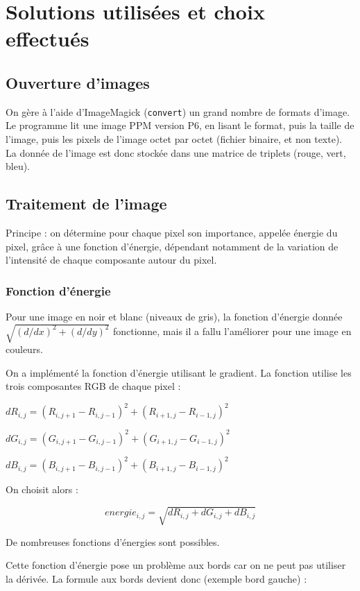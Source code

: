 \documentclass[a4paper]{article}
\begin{document}
\section{Solutions utilisées et choix effectués}

\subsection{Ouverture d'images}

On gère à l'aide d'ImageMagick ({\tt convert}) un grand nombre de formats d'image. Le programme lit une image PPM version P6, en lisant le format, puis la taille de l'image, puis les pixels de l'image octet par octet (fichier binaire, et non texte). La donnée de l'image est donc stockée dans une matrice de triplets (rouge, vert, bleu).


\subsection{Traitement de l'image}

Principe : on détermine pour chaque pixel son importance, appelée énergie du pixel, grâce à une fonction d'énergie, dépendant notamment de la variation de l'intensité de chaque composante autour du pixel.

\subsubsection{Fonction d'énergie}

Pour une image en noir et blanc (niveaux de gris), la fonction d'énergie donnée $\sqrt{(d/dx)^2+(d/dy)^2}$ fonctionne, mais il a fallu l'améliorer pour une image en couleurs.

On a implémenté la fonction d'énergie utilisant le gradient. La fonction utilise les trois composantes RGB de chaque pixel :

$dR_{i,j} = (R_{i,j+1} - R_{i,j-1})^2 + (R_{i+1,j} - R_{i-1,j})^2$

$dG_{i,j} = (G_{i,j+1} - G_{i,j-1})^2 + (G_{i+1,j} - G_{i-1,j})^2$

$dB_{i,j} = (B_{i,j+1} - B_{i,j-1})^2 + (B_{i+1,j} - B_{i-1,j})^2$

On choisit alors :

\[energie_{i,j} = \sqrt{dR_{i,j} + dG_{i,j} + dB_{i,j}}\]

De nombreuses fonctions d'énergies sont possibles.

Cette fonction d'énergie pose un problème aux bords car on ne peut pas utiliser la dérivée. La formule aux bords devient donc (exemple bord gauche) :
\end{document}
